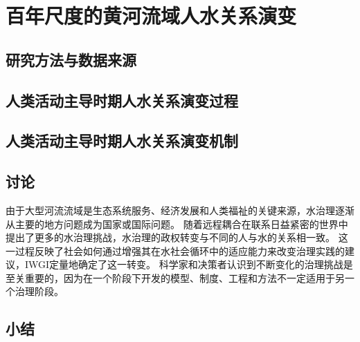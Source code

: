 \chapter{百年尺度的黄河流域人水关系演变}\label{cha:4}


\section{研究方法与数据来源}\label{ch4:methods}


\section{人类活动主导时期人水关系演变过程}\label{ch4:process}


\section{人类活动主导时期人水关系演变机制}\label{ch4:mechanism}


\section{讨论}\label{ch4:discussion}


由于大型河流流域是生态系统服务、经济发展和人类福祉的关键来源，水治理逐渐从主要的地方问题成为国家或国际问题\cite{best2019,best2020}。
随着远程耦合在联系日益紧密的世界中提出了更多的水治理挑战，水治理的政权转变与不同的人与水的关系相一致\cite{diaz2019}。
这一过程反映了社会如何通过增强其在水社会循环中的适应能力来改变治理实践的建议，IWGI定量地确定了这一转变\cite{loch2020,turton1999}。
科学家和决策者认识到不断变化的治理挑战是至关重要的，因为在一个阶段下开发的模型、制度、工程和方法不一定适用于另一个治理阶段\cite{reyers2018}。

\section{小结}\label{ch4:summary}

